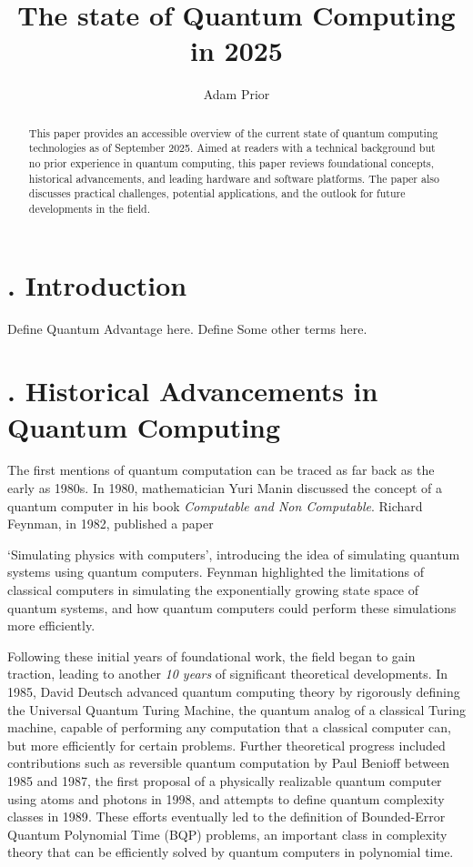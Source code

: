 \documentclass{elbioimp2}
\title{The state of Quantum Computing in 2025}
\author{Adam Prior\affiliation{UrbanFox, Dublin, Ireland}}
\begin{document}
\setcounter{secnumdepth}{2}


\maketitle

\begin{abstract}
This paper provides an accessible overview of the current state of quantum computing technologies as of September 2025. Aimed at readers with a technical background but no prior experience in quantum computing, this paper reviews foundational concepts, historical advancements, and leading hardware and software platforms. The paper also discusses practical challenges, potential applications, and the outlook for future developments in the field.
\end{abstract}

\section{. Introduction}
Define Quantum Advantage here.
Define Some other terms here.



\section{. Historical Advancements in Quantum Computing}
The first mentions of quantum computation can be traced as far back as the early as 1980s.
In 1980, mathematician Yuri Manin discussed the concept of a quantum computer in his book \textit{Computable and Non Computable}\cite{Manin1980}. Richard Feynman, in 1982, published a paper

`Simulating physics with computers', introducing the idea of simulating quantum systems using quantum computers\cite{Feynman1982}. Feynman highlighted the limitations of classical computers in simulating the exponentially growing state space of quantum systems, and how quantum computers could perform these simulations more efficiently.


Following these initial years of foundational work, the field began to gain traction, leading to another \textit{10 years} of significant theoretical developments. In 1985, David Deutsch advanced quantum computing theory by rigorously defining the Universal Quantum Turing Machine, the quantum analog of a classical Turing machine, capable of performing any computation that a classical computer can, but more efficiently for certain problems\cite{Deutsch1985}.
Further theoretical progress included contributions such as reversible quantum computation by Paul Benioff between 1985 and 1987\cite{benioff1986}, the first proposal of a physically realizable quantum computer using atoms and photons in 1998\cite{Igeta:88}, and attempts to define quantum complexity classes in 1989\cite{10.1145/167088.167097}. These efforts eventually led to the definition of Bounded-Error Quantum Polynomial Time (BQP) problems, an important class in complexity theory that can be efficiently solved by quantum computers in polynomial time.
\end{document}
